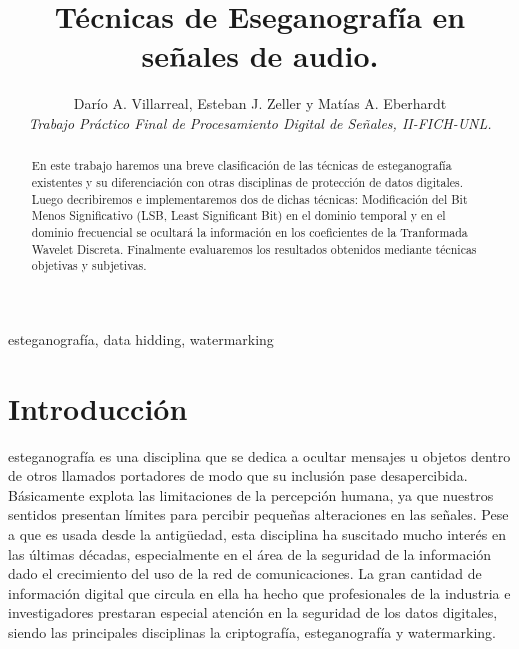 \documentclass[conference,a4paper,10pt, oneside,final]{tfmpd}
\begin{document}
\title{Técnicas de Eseganografía en señales de audio.}

\author{Darío A. Villarreal,
        Esteban J. Zeller y
        Matías A. Eberhardt\\
\textit{Trabajo Práctico Final de Procesamiento Digital de Señales, II-FICH-UNL.}}


\maketitle

\begin{abstract}
En este trabajo haremos una breve clasificación de las técnicas de esteganografía existentes y su diferenciación con otras disciplinas de protección de datos digitales. Luego decribiremos e implementaremos dos de dichas técnicas: Modificación del Bit Menos Significativo (LSB, Least Significant Bit) en el dominio temporal y en el dominio frecuencial se ocultará la información en los coeficientes de la Tranformada Wavelet Discreta. Finalmente evaluaremos los resultados obtenidos mediante técnicas objetivas y subjetivas.
\end{abstract}

\begin{keywords}
esteganografía, data hidding, watermarking
\end{keywords}

\section{Introducción}
 esteganografía es una disciplina que se dedica a ocultar mensajes u objetos dentro de otros llamados portadores de modo que su inclusión pase desapercibida. Básicamente explota las limitaciones de la percepción humana, ya que nuestros sentidos presentan límites para percibir pequeñas alteraciones en las señales.
Pese a que es usada desde la antigüedad, esta disciplina ha suscitado mucho interés en las últimas décadas, especialmente en el área de la seguridad de la información dado el crecimiento del uso de la red de comunicaciones. La gran cantidad de información digital que circula en ella ha hecho que profesionales de la industria e investigadores prestaran especial atención en la seguridad de los datos digitales, siendo las principales disciplinas la criptografía, esteganografía y watermarking. 
\end{document}

